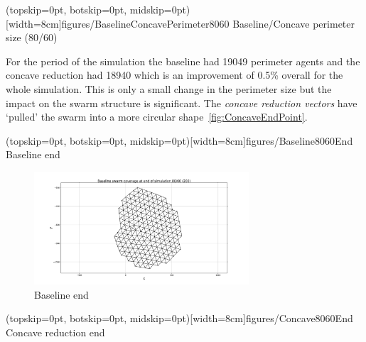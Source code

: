 \documentclass{ieeeaccess}
\begin{document}
\Figure[t!](topskip=0pt, botskip=0pt, midskip=0pt)[width=8cm]{figures/BaselineConcavePerimeter8060}
{Baseline/Concave perimeter size (80/60)\label{concave:BaselineConcavePerimeter8060}}


For the period of the simulation the baseline had 19049 perimeter agents and the concave reduction had 18940 which is an improvement of 0.5\% overall for the whole simulation. This is only a small change in the perimeter size but the impact on the swarm structure is significant. The \textit{concave reduction vectors} have `pulled' the swarm into a more circular shape~\ref{fig:ConcaveEndPoint}.

\Figure[t!](topskip=0pt, botskip=0pt, midskip=0pt)[width=8cm]{figures/Baseline8060End}
{Baseline end\label{fig:BaselineEndPoint}}

\begin{figure}
\begin{center}
\includegraphics[width=8cm]{figures/Baseline8060End}
\end{center}
\caption{Baseline end\label{fig:BaselineEndPoint}}
\end{figure}

\Figure[t!](topskip=0pt, botskip=0pt, midskip=0pt)[width=8cm]{figures/Concave8060End}
{Concave reduction end\label{fig:ConcaveEndPoint}}

\end{document}
